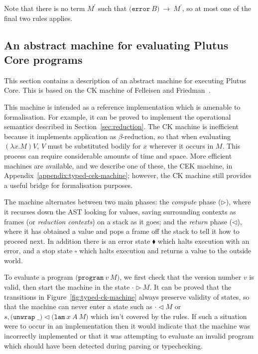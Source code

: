 \documentclass[a4paper]{article}
\newcommand{\keyword}[1]{\texttt{#1}}
\newcommand{\construct}[1]{\texttt{(} #1 \texttt{)}}
\newcommand{\error}[1]{\construct{\keyword{error} ~ #1}}
\newcommand{\step}[2]{#1 ~ \rightarrow ~ #2}
\begin{document}


\noindent Note that there is no term $M^{\prime}$ such that
$\step{\error{B}}{M^{\prime}}$, so at most one of the final two rules
applies.

\subsection{An abstract machine for evaluating Plutus Core programs}
\label{sec:typed-ck-machine}
This section contains a description of an abstract machine for
executing Plutus Core.  This is based on the CK machine of Felleisen
and Friedman~\citep{Felleisen-CK-CEK}.

This machine is intended as a reference implementation which is
amenable to formalisation.  For example, it can be proved to implement
the operational semantics described in Section~\ref{sec:reduction}.
The CK machine is inefficient because it implements application as
$\beta$-reduction, so that when evaluating $(\lambda x.M)V$, $V$ must
be substituted bodily for $x$ wherever it occurs in $M$.  This process
can require considerable amounts of time and space.  More efficient
machines are available, and we describe one of these, the CEK machine,
in Appendix~\ref{appendix:typed-cek-machine}; however, the CK machine still
provides a useful bridge for formalisation purposes.



\noindent The machine alternates between two main phases: the
\textit{compute} phase ($\triangleright$), where it recurses down
the AST looking for values, saving surrounding contexts as frames (or
\textit{reduction contexts}) on a stack as it goes; and the
\textit{return} phase ($\triangleleft$), where it has obtained a value and
pops a frame off the stack to tell it how to proceed next.  In
addition there is an error state $\blacklozenge$ which halts execution
with an error, and a stop state $\square$ which halts execution and
returns a value to the outside world.

To evaluate a program $\texttt{(program}\ v\ M \texttt{)}$, we first
check that the version number $v$ is valid, then start the machine in
the state $\cdot \triangleright M$.  It can be proved that the
transitions in Figure~\ref{fig:typed-ck-machine} always preserve
validity of states, so that the machine can never enter a state such as
  $\cdot \triangleleft M$
or
$s, \texttt{(unwrap \_)} \triangleleft \texttt{(lam}\ x\ A \ M\texttt{)}$
which isn't covered by the rules.  If such a
situation were to occur in an implementation then it would indicate
that the machine was incorrectly implemented or that it was attempting
to evaluate an invalid program which should have been detected during
parsing or typechecking.
\end{document}
